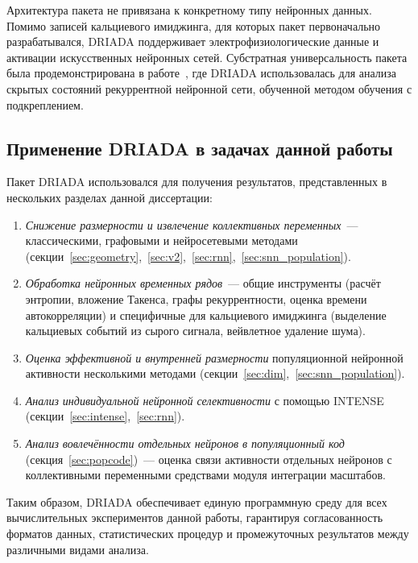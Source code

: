 Архитектура пакета не привязана к конкретному типу нейронных данных. Помимо записей кальциевого имиджинга, для которых пакет первоначально разрабатывался, DRIADA поддерживает электрофизиологические данные и активации искусственных нейронных сетей. Субстратная универсальность пакета была продемонстрирована в работе~\cite{Kononov2025}, где DRIADA использовалась для анализа скрытых состояний рекуррентной нейронной сети, обученной методом обучения с подкреплением.

\subsection{Применение DRIADA в задачах данной работы}

Пакет DRIADA использовался для получения результатов, представленных в нескольких разделах данной диссертации:

\begin{enumerate}
    \item \textit{Снижение размерности и извлечение коллективных переменных}~--- классическими, графовыми и нейросетевыми методами (секции~\ref{sec:geometry},~\ref{sec:v2},~\ref{sec:rnn},~\ref{sec:snn_population}).
    \item \textit{Обработка нейронных временных рядов}~--- общие инструменты (расчёт энтропии, вложение Такенса, графы рекуррентности, оценка времени автокорреляции) и специфичные для кальциевого имиджинга (выделение кальциевых событий из сырого сигнала, вейвлетное удаление шума).
    \item \textit{Оценка эффективной и внутренней размерности} популяционной нейронной активности несколькими методами (секции~\ref{sec:dim},~\ref{sec:snn_population}).
    \item \textit{Анализ индивидуальной нейронной селективности} с помощью INTENSE (секции~\ref{sec:intense},~\ref{sec:rnn}).
    \item \textit{Анализ вовлечённости отдельных нейронов в популяционный код} (секция~\ref{sec:popcode})~--- оценка связи активности отдельных нейронов с коллективными переменными средствами модуля интеграции масштабов.
\end{enumerate}

Таким образом, DRIADA обеспечивает единую программную среду для всех вычислительных экспериментов данной работы, гарантируя согласованность форматов данных, статистических процедур и промежуточных результатов между различными видами анализа.






